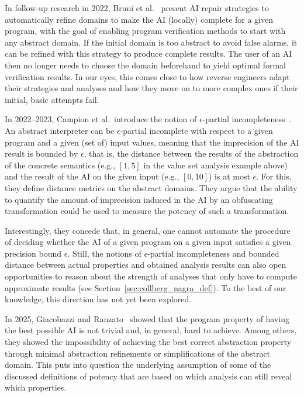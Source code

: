In follow-up research in 2022, Bruni et al.~\cite{bruni2022repair} present AI repair strategies to automatically refine domains to make the AI (locally) complete for a given program, with the goal of enabling program verification methods to start with any abstract domain. If the initial domain is too abstract to avoid false alarms, it can be refined with this strategy to produce complete results. The user of an AI then no longer needs to choose the domain beforehand to yield optimal formal verification results. In our eyes, this comes close to how reverse engineers adapt their strategies and analyses and how they move on to more complex ones if their initial, basic attempts fail. 

In 2022--2023, Campion et al.\ introduce the notion of $\epsilon$-partial incompleteness~\cite{Campion2022,campion23}. An abstract interpreter can be $\epsilon$-partial incomplete with respect to a given program and a given (set of) input values, meaning that the imprecision of the AI result is bounded by $\epsilon$, that is, the distance between the results of the abstraction of the concrete semantics (e.g., $[1,5]$ in the value set analysis example above) and the result of the AI on the given input (e.g., $[0,10]$) is at most $\epsilon$. For this, they define distance metrics on the abstract domains. They argue that the ability to quantify the amount of imprecision induced in the AI by an obfuscating transformation could be used to measure the potency of such a transformation.

Interestingly, they concede that, in general, one cannot automate the procedure of deciding whether the AI of a given program on a given input satisfies a given precision bound $\epsilon$. 
Still, the notions of $\epsilon$-partial incompleteness and bounded distance between actual properties and obtained analysis results can also open opportunities to reason about the strength of analyses that only have to compute approximate results (see Section~\ref{sec:collberg_nagra_def}). To the best of our knowledge, this direction has not yet been explored. 

In 2025, Giacobazzi and Ranzato~\cite{2025roberto} showed that the program property of having the best possible AI is not trivial and, in general, hard to achieve. Among others, they showed the impossibility of achieving the best correct abstraction property through minimal abstraction refinements or simplifications of the abstract domain. This puts into question the underlying assumption of some of the discussed definitions of potency that are based on which analysis can still reveal which properties. 

